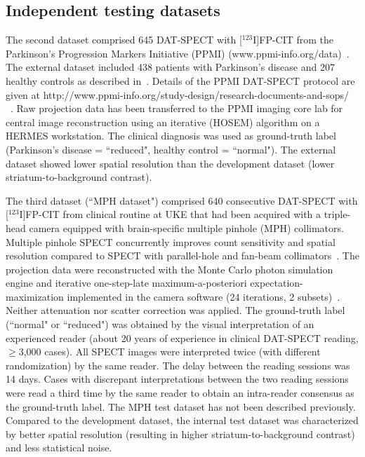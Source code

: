 \subsection{Independent testing datasets}
\label{subsec:external_dataset}

The second dataset comprised 645 DAT-SPECT with [$^{123}$I]FP-CIT from the Parkinson's Progression Markers Initiative (PPMI) 
(www.ppmi-info.org/data)~\citep{Parkinson_Progression_Marker_Initiative2011-px}.
The external dataset included 438 patients with Parkinson's disease and 207 healthy controls as described in~\cite{Wenzel2019}.
Details of the PPMI DAT-SPECT protocol are given at http://www.ppmi-info.org/study-design/research-documents-and-sops/ ~\citep{Parkinson_Progression_Marker_Initiative2011-px}. 
Raw projection data has been transferred to the PPMI imaging core lab for central image reconstruction using an iterative (HOSEM) algorithm on a HERMES workstation. 
The clinical diagnosis was used as ground-truth label (Parkinson's disease = ``reduced", healthy control = ``normal"). 
The external dataset showed lower spatial resolution than the development dataset (lower striatum-to-background contrast).

The third dataset (``MPH dataset") comprised 640 consecutive DAT-SPECT with [$^{123}$I]FP-CIT from clinical routine at UKE 
that had been acquired with a triple-head camera equipped with brain-specific multiple pinhole (MPH) collimators. 
Multiple pinhole SPECT concurrently improves count sensitivity and spatial resolution compared to SPECT with parallel-hole 
and fan-beam collimators~\citep{Mathies2022-yi, Tecklenburg2020-xr}.
The projection data were reconstructed with the Monte Carlo photon simulation engine 
and iterative one-step-late maximum-a-posteriori expectation-maximization implemented 
in the camera software (24 iterations, 2 subsets)~\citep{Tecklenburg2020-xr, Magdics2010}.
Neither attenuation nor scatter correction was applied. 
The ground-truth label (``normal" or ``reduced") was obtained by the visual interpretation of an experienced reader 
(about 20 years of experience in clinical DAT-SPECT reading, $\geq$3,000 cases).
All SPECT images were interpreted twice (with different randomization) by the same reader. 
The delay between the reading sessions was 14 days. 
Cases with discrepant interpretations between the two reading sessions were read a third time by the same reader 
to obtain an intra-reader consensus as the ground-truth label. 
The MPH test dataset has not been described previously.
Compared to the development dataset, the internal test dataset was characterized by better spatial resolution 
(resulting in higher striatum-to-background contrast) and less statistical noise. 

